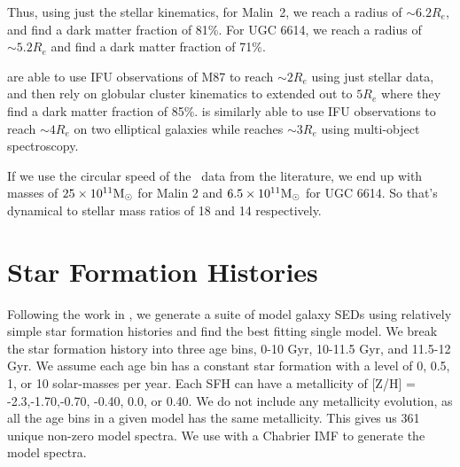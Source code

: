 \documentclass{emulateapj}
\def\arcsec{$^{\prime\prime}$}
\newcommand\msun{\rm{M}_\odot}
\newcommand\HI{\ion{H}{1}}
\begin{document}
Thus, using just the stellar kinematics, for Malin~2, we reach a radius of $\sim 6.2 R_e$, and find a dark matter fraction of 81\%.  For UGC 6614, we reach a radius of  $\sim 5.2 R_e$ and find a dark matter fraction of 71\%.  

\citet{Murphy2011} are able to use IFU observations of M87 to reach $\sim2 R_e$ using just stellar data, and then rely on globular cluster kinematics to extended out to $5 R_e$ where they find a dark matter fraction of 85\%.  \citet{Weij09} is similarly able to use IFU observations to reach $\sim 4 R_e$ on two elliptical galaxies while \citet{Proctor09} reaches $\sim 3 R_e$ using multi-object spectroscopy.  


If we use the circular speed of the \HI\ data from the literature, we end up with masses of $25\times 10^{11} \msun$ for Malin 2 and $6.5\times 10^{11} \msun$ for UGC 6614.  So that's dynamical to stellar mass ratios of 18 and 14 respectively.  %








\section{Star Formation Histories}

Following the work in \citet{Yoachim10,Yoachim12}, we generate a suite of model galaxy SEDs using relatively simple star formation histories and find the best fitting single model.  We break the star formation history into three age bins, 0-10 Gyr, 10-11.5 Gyr, and 11.5-12 Gyr.  We assume each age bin has a constant star formation with a level of 0, 0.5, 1, or 10 solar-masses per year.  Each SFH can have a metallicity of [Z/H] = -2.3,-1.70,-0.70, -0.40, 0.0, or  0.40.  We do not include any metallicity evolution, as all the age bins in a given model has the same metallicity.  This gives us 361 unique non-zero model spectra. We use \citet{Bruzual03} with a Chabrier IMF to generate the model spectra. 
  
\end{document}
